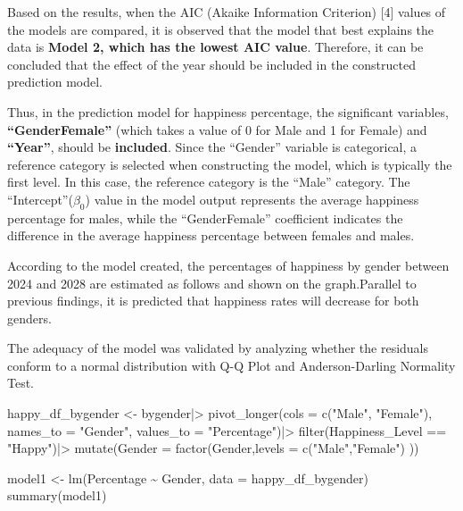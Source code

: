 \documentclass[
  11pt,
  a4paper,
  DIV=11,
  numbers=noendperiod]{scrartcl}
\newenvironment{Shaded}{\begin{snugshade}}{\end{snugshade}}
\newcommand{\AttributeTok}[1]{\textcolor[rgb]{0.40,0.45,0.13}{#1}}
\newcommand{\FunctionTok}[1]{\textcolor[rgb]{0.28,0.35,0.67}{#1}}
\newcommand{\NormalTok}[1]{\textcolor[rgb]{0.00,0.23,0.31}{#1}}
\newcommand{\OtherTok}[1]{\textcolor[rgb]{0.00,0.23,0.31}{#1}}
\newcommand{\SpecialCharTok}[1]{\textcolor[rgb]{0.37,0.37,0.37}{#1}}
\newcommand{\StringTok}[1]{\textcolor[rgb]{0.13,0.47,0.30}{#1}}
\begin{document}
Based on the results, when the AIC (Akaike Information Criterion)
{[}4{]} values of the models are compared, it is observed that the model
that best explains the data is {\textbf{Model 2, which has the lowest
AIC value}}. Therefore, it can be concluded that the effect of the year
should be included in the constructed prediction model.

Thus, in the prediction model for happiness percentage, the significant
variables, {\textbf{``GenderFemale''}} (which takes a value of 0 for
Male and 1 for Female) and {\textbf{``Year''}}, should be
{\textbf{included}}. Since the ``Gender'' variable is categorical, a
reference category is selected when constructing the model, which is
typically the first level. In this case, the reference category is the
``Male'' category. The ``Intercept''(\(\beta_0\)) value in the model
output represents the average happiness percentage for males, while the
``GenderFemale'' coefficient indicates the difference in the average
happiness percentage between females and males.

According to the model created, the percentages of happiness by gender
between 2024 and 2028 are estimated as follows and shown on the
graph.Parallel to previous findings, it is predicted that happiness
rates will decrease for both genders.

The adequacy of the model was validated by analyzing whether the
residuals conform to a normal distribution with Q-Q Plot and
Anderson-Darling Normality Test.

\begin{Shaded}
\begin{Highlighting}[]
\NormalTok{happy\_df\_bygender  }\OtherTok{\textless{}{-}}\NormalTok{ bygender}\SpecialCharTok{|\textgreater{}}
  \FunctionTok{pivot\_longer}\NormalTok{(}\AttributeTok{cols =} \FunctionTok{c}\NormalTok{(}\StringTok{"Male"}\NormalTok{, }\StringTok{"Female"}\NormalTok{), }
               \AttributeTok{names\_to =} \StringTok{"Gender"}\NormalTok{, }
               \AttributeTok{values\_to =} \StringTok{"Percentage"}\NormalTok{)}\SpecialCharTok{|\textgreater{}}
  \FunctionTok{filter}\NormalTok{(Happiness\_Level }\SpecialCharTok{==} \StringTok{"Happy"}\NormalTok{)}\SpecialCharTok{|\textgreater{}}
\FunctionTok{mutate}\NormalTok{(}\AttributeTok{Gender =} \FunctionTok{factor}\NormalTok{(Gender,}\AttributeTok{levels =} \FunctionTok{c}\NormalTok{(}\StringTok{"Male"}\NormalTok{,}\StringTok{"Female"}\NormalTok{)}
\NormalTok{))}

\NormalTok{model1 }\OtherTok{\textless{}{-}} \FunctionTok{lm}\NormalTok{(Percentage }\SpecialCharTok{\textasciitilde{}}\NormalTok{ Gender, }\AttributeTok{data =}\NormalTok{ happy\_df\_bygender)}
\FunctionTok{summary}\NormalTok{(model1)}
\end{Highlighting}
\end{Shaded}
\end{document}
